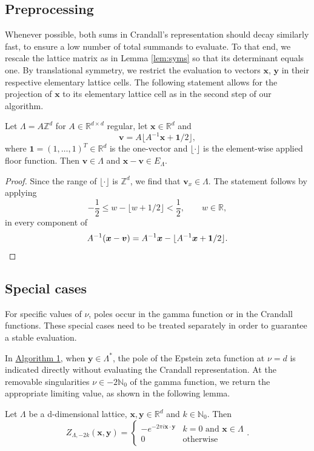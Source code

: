 \documentclass[]{amsart}
\newcommand{\new}[1]{#1}
\newcommand{\zeps}[3]{\new{Z_{#1} (#2, #3)}}
\numberwithin{mythm}{section}
\begin{document}
\subsection{Preprocessing}
\label{sec:preproc}
Whenever possible, both sums in Crandall's representation should decay similarly fast, to ensure a low number of total summands to evaluate. 
To that end, we rescale the lattice matrix as in Lemma \ref{lem:syms} so that its determinant equals one.
By translational symmetry, we restrict the evaluation
to 
vectors \(\bm x\), \(\bm y\) in their respective elementary lattice cells.
The following statement allows for the projection of \(\bm x\) to its elementary lattice cell as in the second step of our algorithm.

\begin{lemma}
Let $\Lambda=A\mathds Z^d$ for $A\in\mathds R^{d\times d}$ regular, let $\bm x \in \mathds{R}^d$
and 
\[
\bm v = A\lfloor A^{-1} \bm x + \bm 1/2 \rfloor,
\]
where \(\bm 1=(1,\ldots,1)^T\in\mathds R^d\) is the one-vector and
$\lfloor \cdot\rfloor$ is the element-wise applied floor function.
Then \(\bm v\in\Lambda\) and \(\bm x-\bm v\in E_{\Lambda}\).
\end{lemma}
\begin{proof}
Since the range of $\lfloor\cdot\rfloor$ is $\mathds{Z}^d$, we find that $\bm v_x \in \Lambda$. 
The statement follows by applying
\[ -\frac 12\le w-\lfloor w+1/2\rfloor <\frac 12,\qquad w\in\mathds R,\]
in every component of
\[A^{-1}(\bm x-\bm v)=A^{-1}\bm x-\lfloor A^{-1}\bm x+\bm 1/2\rfloor.
\qedhere
\]
\end{proof}

\subsection{Special cases}
\label{sec:special}
For specific values of $\nu$, poles occur in the gamma function or in the Crandall functions. These special cases need to be treated separately in order to guarantee a stable evaluation.

In \hyperref[alg]{Algorithm 1}, when \(\bm y\in\Lambda^*\), the pole of the Epstein zeta function at \(\nu=d\) is indicated directly without evaluating the Crandall representation.
At the removable singularities \(\nu\in -2 \mathds N_0\) of the gamma function, we return the appropriate limiting value, as shown in the following lemma.

\begin{lemma}
Let $\Lambda$ be a d-dimensional lattice, $\bm x, \bm y \in \mathds{R}^d$ and \(k\in\mathds N_0\). Then
\[
\zeps{\Lambda,-2k}{\bm x}{\bm y}
=
\begin{cases}
-e^{-2\pi i\bm x\cdot \bm y} & k=0\text{ and }\bm x\in\Lambda \\
0 & \text{otherwise}
\end{cases}.
\]
\end{lemma}
\end{document}
